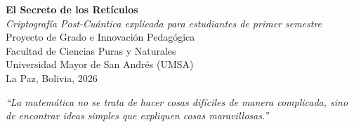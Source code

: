 \documentclass[11pt,a4paper,oneside]{book}
\begin{document}
\thispagestyle{empty}
\vspace*{\fill}
\begin{center}
\sffamily\small
\textbf{El Secreto de los Retículos}\\
\textit{Criptografía Post-Cuántica explicada para estudiantes de primer semestre}\\
\vspace{0.4cm}
Proyecto de Grado e Innovación Pedagógica\\
Facultad de Ciencias Puras y Naturales\\
Universidad Mayor de San Andrés (UMSA)\\
La Paz, Bolivia, 2026\\
\vspace{0.8cm}
\begin{minipage}{0.8\textwidth}
\centering\itshape\color{gray!80!black}
``La matemática no se trata de hacer cosas difíciles de manera complicada, sino de encontrar ideas simples que expliquen cosas maravillosas.''
\end{minipage}
\end{center}
\vspace*{\fill}
\newpage

\tableofcontents
\newpage










\end{document}
